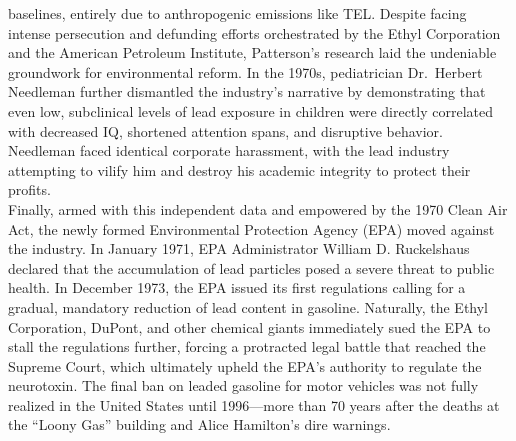 \documentclass[
]{article}
\begin{document}
baselines, entirely due to anthropogenic emissions like TEL. Despite facing intense persecution and defunding
efforts orchestrated by the Ethyl Corporation and the American Petroleum
Institute, Patterson's research laid the undeniable groundwork for
environmental reform. In the 1970s, pediatrician Dr.~Herbert Needleman
further dismantled the industry's narrative by demonstrating that even
low, subclinical levels of lead exposure in children were directly
correlated with decreased IQ, shortened attention spans, and disruptive
behavior. Needleman faced identical corporate harassment, with the lead
industry attempting to vilify him and destroy his academic integrity to
protect their profits.\\
Finally, armed with this independent data and empowered by the 1970
Clean Air Act, the newly formed Environmental Protection Agency (EPA)
moved against the industry. In January 1971, EPA Administrator William
D. Ruckelshaus declared that the accumulation of lead particles posed a
severe threat to public health. In December 1973, the EPA issued its
first regulations calling for a gradual, mandatory reduction of lead
content in gasoline. Naturally, the Ethyl Corporation, DuPont, and other
chemical giants immediately sued the EPA to stall the regulations
further, forcing a protracted legal battle that reached the Supreme
Court, which ultimately upheld the EPA's authority to regulate the
neurotoxin. The final ban on leaded gasoline for motor vehicles was not
fully realized in the United States until 1996---more than 70 years
after the deaths at the ``Loony Gas'' building and Alice Hamilton's dire
warnings.
\end{document}
